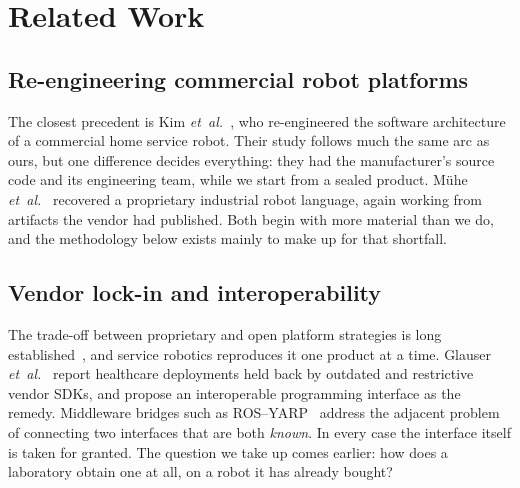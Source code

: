 
\section{Related Work}
\label{sec:related}

\subsection{Re-engineering commercial robot platforms}
The closest precedent is Kim \emph{et~al.}~\cite{kim2005reengineering}, who re-engineered the
software architecture of a commercial home service robot. Their study follows much the same arc
as ours, but one difference decides everything: they had the manufacturer's source code and its
engineering team, while we start from a sealed product. M\"uhe \emph{et~al.}~\cite{muhe2010kuka}
recovered a proprietary industrial robot language, again working from artifacts the vendor had
published. Both begin with more material than we do, and the methodology below exists mainly to
make up for that shortfall.

\subsection{Vendor lock-in and interoperability}
The trade-off between proprietary and open platform strategies is long
established~\cite{west2003open}, and service robotics reproduces it one product at a time.
Glauser \emph{et~al.}~\cite{glauser2023interop} report healthcare deployments held back by
outdated and restrictive vendor SDKs, and propose an interoperable programming interface as the
remedy. Middleware bridges such as ROS--YARP~\cite{aragao2016yarp} address the adjacent problem
of connecting two interfaces that are both \emph{known}. In every case the interface itself is
taken for granted. The question we take up comes earlier: how does a laboratory obtain one at
all, on a robot it has already bought?

